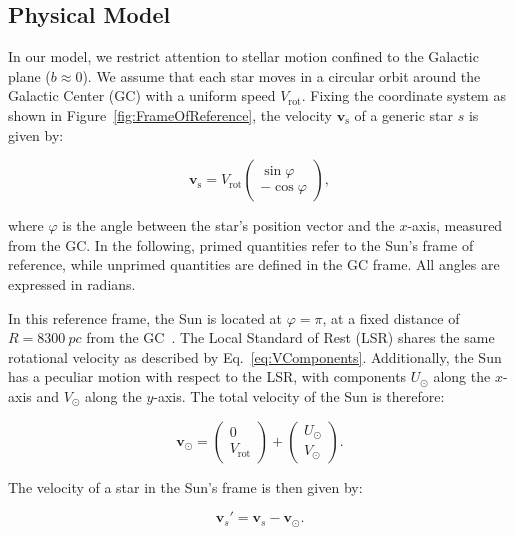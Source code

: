 \subsection{Physical Model}\label{subsec:PhysicalModel}

In our model, we restrict attention to stellar motion confined to the Galactic plane ($b \approx 0$). We assume that each star moves in a circular orbit around the Galactic Center (GC) with a uniform speed $V_{\text{rot}}$. Fixing the coordinate system as shown in Figure~\ref{fig:FrameOfReference}, the velocity $\bm{v}_{\text{s}}$ of a generic star $s$ is given by:

\begin{equation}\label{eq:VComponents}
    \bm{v}_{\text{s}} = V_{\text{rot}} \begin{pmatrix} \sin\varphi \\ -\cos\varphi \end{pmatrix},
\end{equation}

\noindent
where $\varphi$ is the angle between the star’s position vector and the $x$-axis, measured from the GC. In the following, primed quantities refer to the Sun's frame of reference, while unprimed quantities are defined in the GC frame. All angles are expressed in radians.



In this reference frame, the Sun is located at $\varphi = \pi$, at a fixed distance of $R = \qty{8300}{pc}$ from the GC~\cite{GalacticKinematics}. The Local Standard of Rest (LSR) shares the same rotational velocity as described by Eq.~\ref{eq:VComponents}. Additionally, the Sun has a peculiar motion with respect to the LSR, with components $U_{\odot}$ along the $x$-axis and $V_{\odot}$ along the $y$-axis. The total velocity of the Sun is therefore:

\begin{equation}\label{eq:VSun}
    \bm{v}_{\odot} = \begin{pmatrix} 0 \\ V_{\text{rot}} \end{pmatrix} + \begin{pmatrix} U_{\odot} \\ V_{\odot} \end{pmatrix}.
\end{equation}

The velocity of a star in the Sun's frame is then given by:

\begin{equation}\label{eq:ReferenceFrame}
    \bm{v}_s' = \bm{v}_s - \bm{v}_{\odot}.
\end{equation}

